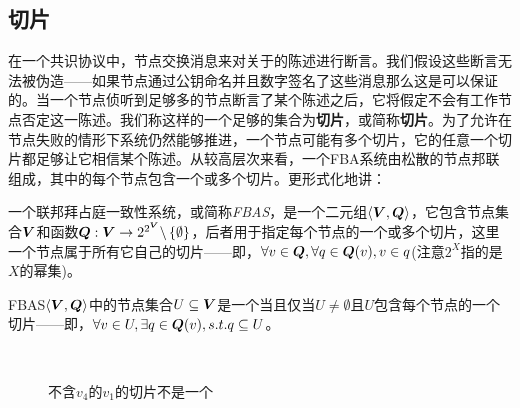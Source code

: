 \subsection{{\quorum}切片}

在一个共识协议中，节点交换消息来对关于{\slot}的陈述进行断言。我们假设这些断言无法被伪造——如果节点通过公钥命名并且数字签名了这些消息那么这是可以保证的。当一个节点侦听到足够多的节点断言了某个陈述之后，它将假定不会有工作节点否定这一陈述。我们称这样的一个足够的集合为\textbf{{\quorum}切片}，或简称\textbf{切片}。为了允许在节点失败的情形下系统仍然能够推进，一个节点可能有多个切片，它的任意一个切片都足够让它相信某个陈述。从较高层次来看，一个FBA系统由松散的节点邦联组成，其中的每个节点包含一个或多个切片。更形式化地讲：

\begin{definition}[FBAS]
	一个联邦拜占庭一致性系统，或简称\textit{FBAS}，是一个二元组$\langle{\bm V}, {\bm Q}\rangle$，它包含节点集合${\bm V}$和{\quorum}函数${\bm Q}:{\bm V}\rightarrow2^{2^{{\bm V}}}\backslash\left\{\emptyset\right\}$，后者用于指定每个节点的一个或多个切片，这里一个节点属于所有它自己的切片——即，$\forall v\in{\bm Q},\forall q\in{{\bm Q}(v)},v\in q$(注意$2^X$指的是$X$的幂集)。
\end{definition}

\begin{definition}[\quorum]
	FBAS$\langle{\bm V},{\bm Q}\rangle$中的节点集合$U\subseteq{\bm V}$是一个\textbf{\quorum}当且仅当$U\neq \emptyset$且$U$包含每个节点的一个切片——即，$\forall v\in U, \exists q \in {\bm Q}(v), s.t. q\subseteq U$。
\end{definition}

\begin{figure}
\centering
{}\\
\caption{不含$v_4$的$v_1$的{\quorum}切片不是一个{\quorum}}
\label{fig:slice-vs-quorum}
\end{figure}

